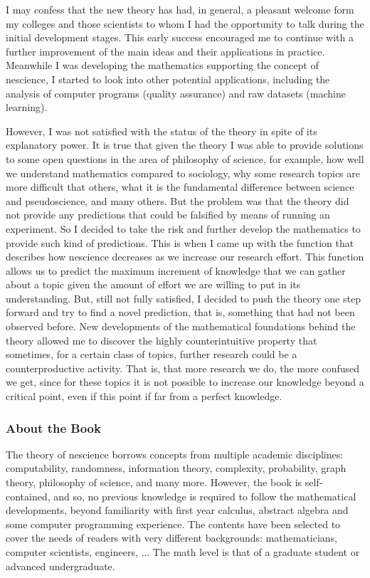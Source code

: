 I may confess that the new theory has had, in general, a pleasant welcome form my colleges and those scientists to whom I had the opportunity to talk during the initial development stages. This early success encouraged me to continue with a further improvement of the main ideas and their applications in practice. Meanwhile I was developing the mathematics supporting the concept of nescience, I started to look into other potential applications, including the analysis of computer programs (quality assurance) and raw datasets (machine learning).

However, I was not satisfied with the status of the theory in spite of its explanatory power. It is true that given the theory I was able to provide solutions to some open questions in the area of philosophy of science, for example, how well we understand mathematics compared to sociology, why some research topics are more difficult that others, what it is the fundamental difference between science and pseudoscience, and many others. But the problem was that the theory did not provide any predictions that could be falsified by means of running an experiment. So I decided to take the risk and further develop the mathematics to provide such kind of predictions. This is when I came up with the function that describes how nescience decreases as we increase our research effort. This function allows us to predict the maximum increment of knowledge that we can gather about a topic given the amount of effort we are willing to put in its understanding. But, still not fully satisfied, I decided to push the theory one step forward and try to find a novel prediction, that is, something that had not been observed before. New developments of the mathematical foundations behind the theory allowed me to discover the highly counterintuitive property that sometimes, for a certain class of topics, further research could be a counterproductive activity. That is, that more research we do, the more confused we get, since for these topics it is not possible to increase our knowledge beyond a critical point, even if this point if far from a perfect knowledge.

%
%

\subsubsection*{About the Book}

The theory of nescience borrows concepts from multiple academic disciplines: computability, randomness, information theory, complexity, probability, graph theory, philosophy of science, and many more. However, the book is self-contained, and so, no previous knowledge is required to follow the mathematical developments, beyond familiarity with first year calculus, abstract algebra and some computer programming experience. The contents have been selected to cover the needs of readers with very different backgrounds: mathematicians, computer scientists, engineers, ... The math level is that of a graduate student or advanced undergraduate.

